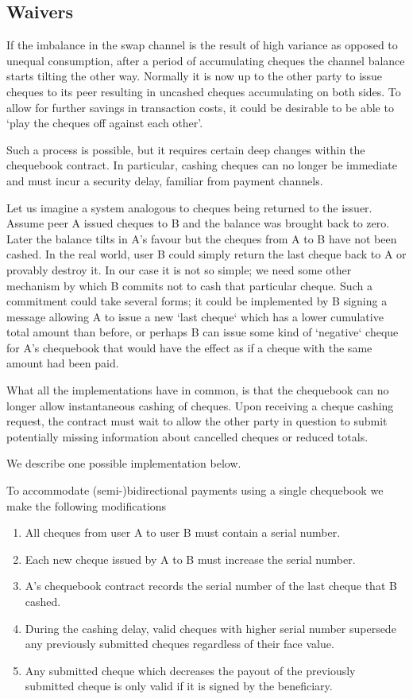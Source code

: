 \subsection{Waivers}
\label{subsubsec:waivingdebt}

If the imbalance in the swap channel is the result of high variance as opposed to unequal consumption, after a period of accumulating cheques the channel balance starts tilting the other way. Normally it is now up to the other party to issue cheques to its peer resulting in uncashed cheques accumulating on both sides.
To allow for further savings in transaction costs, it could be desirable to be able to `play the cheques off against each other'.

Such a process is possible, but it requires certain deep changes within the chequebook contract. In particular, cashing cheques can no longer be immediate and must incur a security delay, familiar from payment channels.

Let us imagine a system analogous to cheques being returned to the issuer.  
Assume peer A issued cheques to B and the balance was brought back to zero. Later the balance tilts in A's favour but the cheques from A to B have not been cashed. In the real world, user B could simply return the last cheque back to A or provably destroy it. In our case it is not so simple; we need some other mechanism by which B commits not to cash that particular cheque. Such a commitment could take several forms; it could be implemented by B signing a message allowing A to issue a new `last cheque` which has a lower cumulative total amount than before, or perhaps B can issue some kind of `negative` cheque for A's chequebook that would have the effect as if a cheque with the same amount had been paid. 

What all the implementations have in common, is that the chequebook can no longer allow instantaneous cashing of cheques. Upon receiving a cheque cashing request, the contract must wait to allow the other party in question to submit potentially missing information about cancelled cheques or reduced totals. 

We describe one possible implementation below.

To accommodate (semi-)bidirectional payments using a single chequebook we make the following modifications

\begin{enumerate}
    \item All cheques from user A to user B must contain a serial number.
    \item Each new cheque issued by A to B must increase the serial number.
    \item A's chequebook contract records the serial number of the last cheque that B cashed.
    \item During the cashing delay, valid cheques with higher serial number supersede any previously submitted cheques regardless of their face value.
    \item Any submitted cheque which decreases the payout of the previously submitted cheque is only valid if it is signed by the beneficiary.
\end{enumerate}

